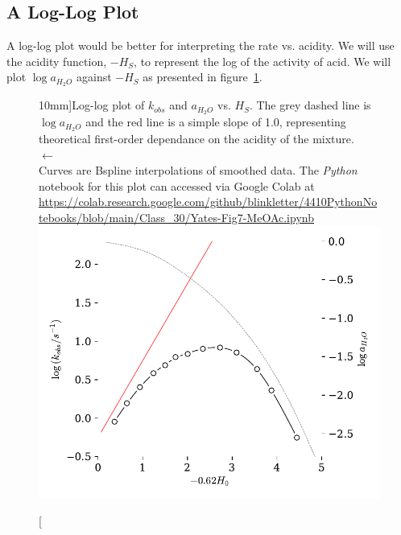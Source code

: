 \documentclass[]{tufte-handout}
\begin{document}
\subsection{A Log-Log Plot}

A log-log plot would be better for interpreting the rate vs. acidity. We will use the acidity function, $-H_S$, to represent the log of the activity of acid. We will plot $\log{a_{H_2O}}$ against $-H_S$ as presented in figure~\ref{fig:fig7}.

\begin{figure}[h!]
  \centering
  \caption[][10mm]{Log-log plot of $k_{obs}$ and $a_{H_2O}$ vs. $H_S$. The grey dashed line is $\log{a_{H_2O}}$ and the red line is a simple slope of 1.0, representing theoretical first-order dependance on the acidity of the mixture. \\ $\longleftarrow$ \\ \vspace{1mm} Curves are Bspline interpolations of smoothed data. The \textit{Python} notebook for this plot can accessed via Google Colab at \url{https://colab.research.google.com/github/blinkletter/4410PythonNotebooks/blob/main/Class_30/Yates-Fig7-MeOAc.ipynb}} 
  \includegraphics[scale=0.7]{images/fig3}
  \label{fig:fig7}
\end{figure}
\end{document}
